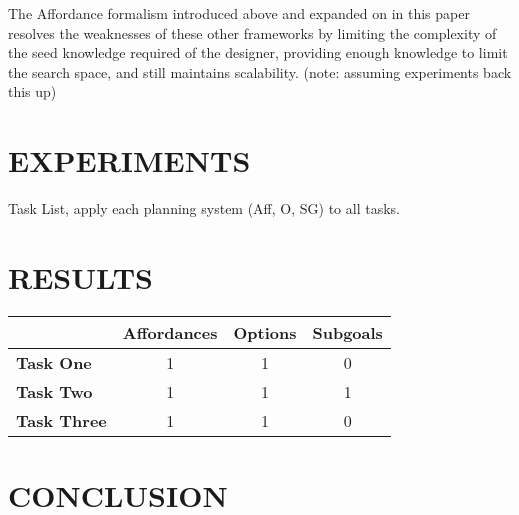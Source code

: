 The Affordance formalism introduced above and expanded on in this paper resolves the weaknesses of these other frameworks by limiting the complexity of the seed knowledge required of the designer, providing enough knowledge to limit the search space, and still maintains scalability. (note: assuming experiments back this up)


\section{EXPERIMENTS}

Task List, apply each planning system (Aff, O, SG) to all tasks.

\section{RESULTS}

\begin{tabular}{ l || c | c | c }
  & Affordances & Options & Subgoals \\
  \hline
  {\bf Task One} & 1 & 1 & 0 \\
  {\bf Task Two} & 1 & 1 & 1 \\
  {\bf Task Three} & 1 & 1 & 0 \\
\end{tabular}



\section{CONCLUSION}

